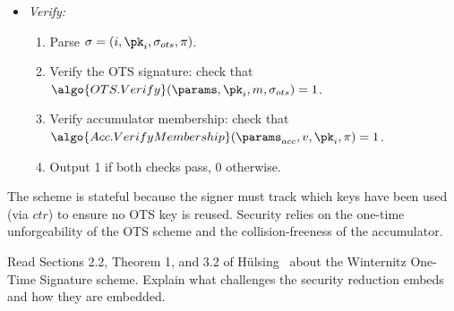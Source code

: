 \begin{mysolution}
\begin{itemize}
    \item \emph{Verify:}
      \begin{enumerate}
        \item Parse $\sigma = (i, \pk_i, \sigma_{ots}, \pi)$.
        \item Verify the OTS signature: check that $\algo{OTS.Verify}(\params, \pk_i, m, \sigma_{ots}) = 1$.
        \item Verify accumulator membership: check that $\algo{Acc.VerifyMembership}(\params_{acc}, v, \pk_i, \pi) = 1$.
        \item Output 1 if both checks pass, 0 otherwise.
      \end{enumerate}
  \end{itemize}
  The scheme is stateful because the signer must track which keys have been used (via $\mathit{ctr}$) to ensure no OTS key is reused.
  Security relies on the one-time unforgeability of the OTS scheme and the collision-freeness of the accumulator.
\end{mysolution}
\fi

\begin{exercise}[Optional]
  Read Sections 2.2, Theorem 1, and 3.2 of Hülsing~\cite{AFRICACRYPT:Hulsing13} about the Winternitz One-Time Signature scheme.
  Explain what challenges the security reduction embeds and how they are embedded.
\end{exercise}

